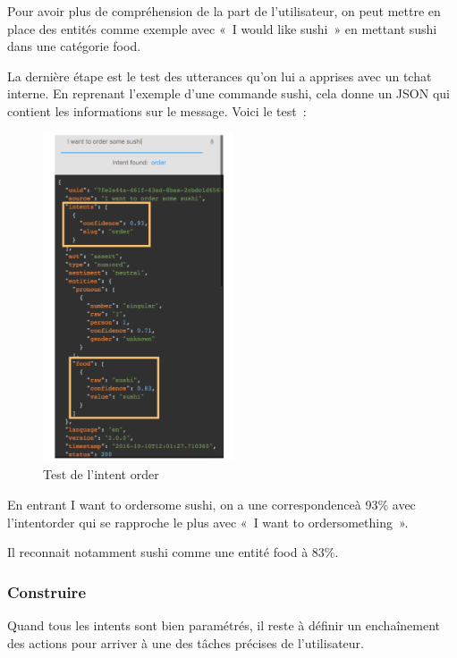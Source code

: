 Pour avoir plus de compréhension de la part de l’utilisateur, on peut mettre en place des entités comme exemple avec « I would like sushi » en mettant sushi dans une catégorie food.
\vspace{1em}

	La dernière étape est le test des utterances qu’on lui a apprises avec un tchat interne. En reprenant l’exemple d’une commande sushi, cela donne un JSON qui contient les informations sur le message.
Voici le test :
\vspace{1em}

\begin{figure}[H]
	\centering
		\includegraphics[width = 0.5\textwidth]{test.png}
	\caption{Test de l'intent order}
	\label{fig:Test de l'intent order}
\end{figure}
\vspace{1em}

En entrant I want to ordersome sushi, on a une correspondenceà 93\% avec l’intentorder qui se rapproche le plus avec « I want to ordersomething ».
\vspace{1em}

Il reconnait notamment sushi comme une entité food à 83\%.

\subsubsection{Construire}

Quand tous les intents sont bien paramétrés, il reste à définir un enchaînement des actions pour arriver à une des tâches précises de l’utilisateur.
\vspace{1em}

